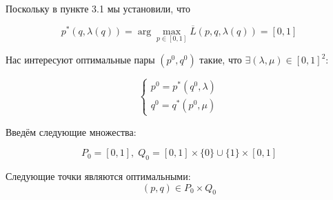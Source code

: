 \begin{flushleft}
	Поскольку в пункте 3.1 мы установили, что 
	
	$$p^*(q,\lambda(q))=\arg \max \limits_{p \in [0,1]}
		\overline{L}(p, q, \lambda(q))=[0,1]
	$$

	Нас интересуют оптимальные пары $(p^0,q^0)$ такие, что 
	$\exists (\lambda, \mu) \in [0,1]^2 $:
	
	$$\begin{cases}
	p^0=p^*(q^0,\lambda) \\
	q^0=q^*(p^0,\mu)
	\end{cases}$$
	
	Введём следующие множества:
	
	$$P_0=[0,1], \; Q_0=[0,1] \times \{0\} \cup \{1\} \times [0,1]$$
	
	Следующие точки являются оптимальными:
	$$(p, q) \in P_0 \times Q_0$$
		

\end{flushleft}



















